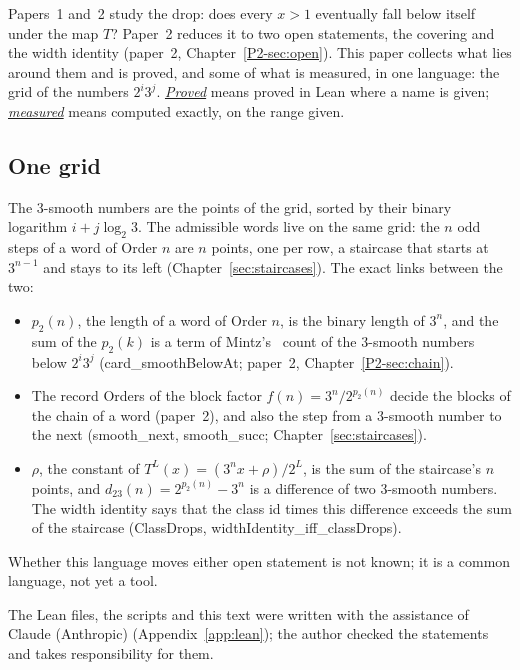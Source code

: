\documentclass[10pt,a4paper,titlepage]{article}
\makeatletter
\newcommand{\termhere}[1]{\leavevmode
  \Hy@raisedlink{\hyper@anchorstart{term:#1}\hyper@anchorend}}
\newcommand{\keyterm}[2]{\hyperlink{box:#1}{\emph{#2}}}
\newcommand{\lean}[1]{\textsf{#1}}
\makeatother
\begin{document}
Papers~1 and~2 study the drop: does every $x > 1$ eventually fall below itself under the
map $T$? Paper~2 reduces it to two open statements, the covering and the width identity
(paper~2, Chapter~\ref{P2-sec:open}). This paper collects what lies around them and is
proved, and some of what is measured, in one language: the grid of the numbers $2^i 3^j$.
\termhere{proved}\keyterm{proved}{Proved} means proved in Lean where a name is given;
\termhere{measured}\keyterm{measured}{measured} means computed exactly, on the range given.

\subsection*{One grid}

The $3$-smooth numbers are the points of the grid, sorted by their binary logarithm
$i + j\log_2 3$. The admissible words live on the same grid: the $n$ odd steps of a word of
Order $n$ are $n$ points, one per row, a staircase that starts at $3^{n-1}$ and stays to
its left (Chapter~\ref{sec:staircases}). The exact links between the two:
\begin{itemize}
\item $p_2(n)$, the length of a word of Order $n$, is the binary length of $3^n$, and the
  sum of the $p_2(k)$ is a term of Mintz's~\cite{Mintz1981} count of the $3$-smooth numbers below $2^i 3^j$
  (\lean{card\_smoothBelowAt}; paper~2, Chapter~\ref{P2-sec:chain}).
\item The record Orders of the block factor $f(n) = 3^n/2^{p_2(n)}$ decide the blocks of the
  chain of a word (paper~2), and also the step from a $3$-smooth number to the next
  (\lean{smooth\_next}, \lean{smooth\_succ}; Chapter~\ref{sec:staircases}).
\item $\rho$, the constant of $T^L(x) = (3^n x + \rho)/2^L$, is the sum of the staircase's
  $n$ points, and $d_{23}(n) = 2^{p_2(n)} - 3^n$ is a difference of two $3$-smooth numbers.
  The width identity says that the class id times this difference exceeds the sum of the
  staircase (\lean{ClassDrops}, \lean{widthIdentity\_iff\_classDrops}).
\end{itemize}
Whether this language moves either open statement is not known; it is a common language,
not yet a tool.

The Lean files, the scripts and this text were written with the assistance of Claude
(Anthropic) (Appendix~\ref{app:lean}); the author checked the statements and takes
responsibility for them.
\end{document}

